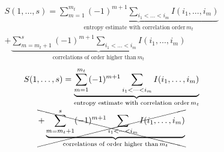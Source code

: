 \documentclass{beamer}
\begin{document}
\begin{frame}%
    \begin{overprint}
    \begin{multline*}
        S(1,\dots,s) = \underbrace{\sum_{m=1}^{m_t} (-1)^{m+1} \sum_{i_1<\dots<i_m} I(i_1,\dots,i_m)}_{\text{entropy estimate with correlation order}\, m_t} \\
        + \underbrace{\sum_{m=m_t+1}^{s} (-1)^{m+1} \sum_{i_1<\dots<i_m} I(i_1,\dots,i_m)}_{\text{correlations of order higher than}\, m_t} 
    \end{multline*}
    \begin{multline*}
        S(1,\dots,s) = \underbrace{\sum_{m=1}^{m_t} (-1)^{m+1} \sum_{i_1<\dots<i_m} I(i_1,\dots,i_m)}_{\text{entropy estimate with correlation order}\, m_t} \\
        \xcancel{+ \underbrace{\sum_{m=m_t+1}^{s} (-1)^{m+1} \sum_{i_1<\dots<i_m} I(i_1,\dots,i_m)}_{\text{correlations of order higher than}\, m_t} }
    \end{multline*}
    \end{overprint}
\end{frame}%
\end{document}
